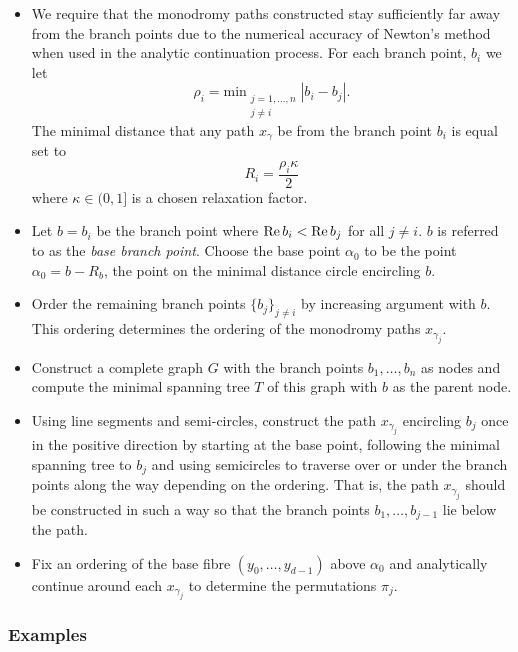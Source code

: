 \begin{itemize}
  \item We require that the monodromy paths constructed stay
    sufficiently far away from the branch points due to the numerical
    accuracy of Newton's method when used in the analytic continuation
    process. For each branch point, $b_i$ we let
    \[
        \rho_i =
        \text{min}_{\substack{j=1,\ldots,n \\ j\neq i}} |b_i - b_j|.
    \]
    The minimal distance that any path $x_\gamma$ be from the branch
    point $b_i$ is equal set to
    \[
        R_i = \frac{\rho_i \kappa}{2}
    \]
    where $\kappa \in (0,1]$ is a chosen relaxation factor.
  \item Let $b = b_i$ be the branch point where $\operatorname{\text{Re}} b_i < \operatorname{\text{Re}} b_j$ for
    all $j \neq i$. $b$ is referred to as the {\it base branch
      point}. Choose the base point $\alpha_0$ to be the point $\alpha_0
    = b - R_b$, the point on the minimal distance circle encircling $b$.
  \item Order the remaining branch points $\{b_j\}_{j \neq i}$ by
    increasing argument with $b$. This ordering determines the ordering
    of the monodromy paths $x_{\gamma_j}$.
  \item Construct a complete graph $G$ with the branch points
    $b_1,\ldots,b_n$ as nodes and compute the minimal spanning tree $T$
    of this graph with $b$ as the parent node.
  \item Using line segments and semi-circles, construct the path
    $x_{\gamma_j}$ encircling $b_j$ once in the positive direction by
    starting at the base point, following the minimal spanning tree to
    $b_j$ and using semicircles to traverse over or under the branch
    points along the way depending on the ordering. That is, the path
    $x_{\gamma_j}$ should be constructed in such a way so that the
    branch points $b_1,\ldots,b_{j-1}$ lie below the path.
  \item Fix an ordering of the base fibre $(y_0,\ldots,y_{d-1})$ above
    $\alpha_0$ and analytically continue around each $x_{\gamma_j}$ to
    determine the permutations $\pi_j$.
\end{itemize}

%
\subsubsection*{Examples}
%

\vspace{24pt}


